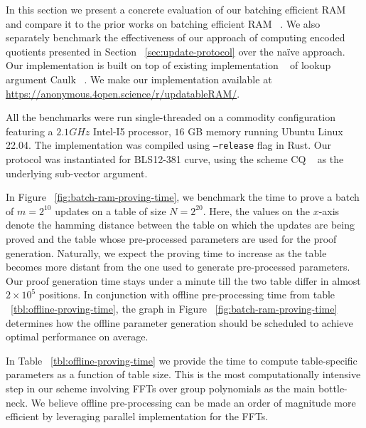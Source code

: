 In this section we present a concrete evaluation of our batching efficient RAM and compare it to the
prior works on batching efficient RAM ~\cite{USENIX:OWWB20,CCS:CFHKKO22}.
We also separately benchmark the effectiveness of our approach of computing encoded quotients presented
in Section ~\ref{sec:update-protocol} over the na\"{i}ve approach.
Our implementation is built on top of existing implementation ~\cite{caulk-implementation}
of lookup argument Caulk ~\cite{CCS:ZBKMNS22}. We make our implementation available at
\url{https://anonymous.4open.science/r/updatableRAM/}. 

 All the benchmarks were run single-threaded on a commodity configuration featuring a
$2.1GHz$ Intel-I5 processor, $16$ GB memory running Ubuntu Linux 22.04. The implementation was compiled using {\tt --release}
flag in Rust. Our protocol was instantiated for BLS12-381 curve, using the scheme CQ ~\cite{EPRINT:EagFioGab22}
as the underlying sub-vector argument.

 In Figure ~\ref{fig:batch-ram-proving-time}, we benchmark the time
to prove a batch of $m=2^{10}$ updates on a table of size $N=2^{20}$. Here, the values on the $x$-axis denote
the hamming distance between the table on which the updates are being proved and the table whose pre-processed
parameters are used for the proof generation. Naturally, we expect the proving time to increase as the table
becomes more distant from the one used to generate pre-processed parameters. Our proof generation time stays
under a minute till the two table differ in almost $2\times 10^5$ positions. In conjunction with offline
pre-processing time from table ~\ref{tbl:offline-proving-time}, the graph in Figure ~\ref{fig:batch-ram-proving-time}
determines how the offline parameter generation should be scheduled to achieve optimal performance on average.

 In Table ~\ref{tbl:offline-proving-time} we provide the time to compute
table-specific parameters as a function of table size. This is the most computationally intensive step in our
scheme involving FFTs over group polynomials as the main bottle-neck. We believe offline pre-processing can be
made an order of magnitude more efficient by leveraging parallel implementation for the FFTs.

